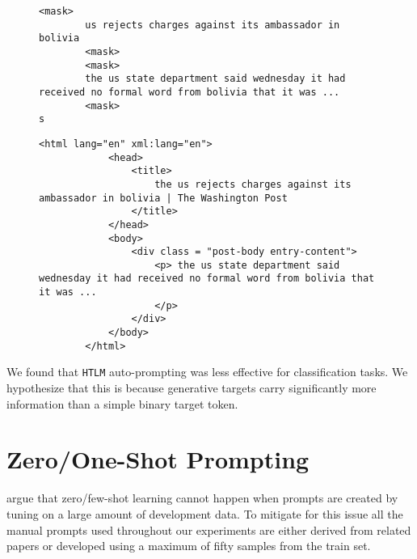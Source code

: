 \documentclass[11pt,a4paper]{article}
\newcommand{\HTLM}{\texttt{HTLM}}
\begin{document}
\begin{figure*}[!htbp]
\centering

\begin{subfigure}{.45\textwidth}
    \centering
    \begin{lstlisting}[numbers=none, basicstyle=\tiny\ttfamily]
        <mask> 
        us rejects charges against its ambassador in bolivia 
        <mask>
        <mask> 
        the us state department said wednesday it had received no formal word from bolivia that it was ... 
        <mask>
s    \end{lstlisting}
\end{subfigure} 
\begin{subfigure}{.45\textwidth}
    \centering
    \begin{lstlisting}[numbers=none, basicstyle=\tiny\ttfamily]
        <html lang="en" xml:lang="en">
            <head>
                <title>
                    the us rejects charges against its ambassador in bolivia | The Washington Post
                </title>
            </head>
            <body>
                <div class = "post-body entry-content"> 
                    <p> the us state department said wednesday it had received no formal word from bolivia that it was ...
                    </p>
                </div>
            </body>
        </html>
    \end{lstlisting}
\end{subfigure}
\cprotect\caption{An example of auto-prompting using a sample from the train-set of the Gigaword dataset. \HTLM{} places the summary inside of a \verb+<title>+ inside of a \verb+<head>+ element, while placing the article in a \verb+<div>+ element with an \verb+entry-content+ attribute value for attribute \verb+class+ which is common on news web-sites.}
\label{fig:auto_prompting}
\end{figure*}

We found that \HTLM{} auto-prompting was less effective for classification tasks. We hypothesize that this is because generative targets carry significantly more information than a simple binary target token.

\section{Zero/One-Shot Prompting}
\citet{true_few_shot_learning} argue that zero/few-shot learning cannot happen when prompts are created by tuning on a large amount of development data. To mitigate for this issue all the manual prompts used throughout our experiments are either derived from related papers or developed using a maximum of fifty samples from the train set.
\end{document}
